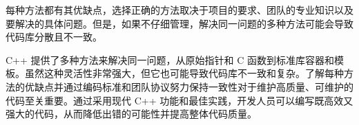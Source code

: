 每种方法都有其优缺点，选择正确的方法取决于项目的要求、团队的专业知识以及要解决的具体问题。但是，如果不仔细管理，解决同一问题的多种方法可能会导致代码库分散且不一致。

C++ 提供了多种方法来解决同一问题，从原始指针和 C 函数到标准库容器和模板。虽然这种灵活性非常强大，但它也可能导致代码库不一致和复杂。了解每种方法的优缺点并通过编码标准和团队协议努力保持一致性对于维护高质量、可维护的代码至关重要。通过采用现代 C++ 功能和最佳实践，开发人员可以编写既高效又强大的代码，从而降低出错的可能性并提高整体代码质量。


